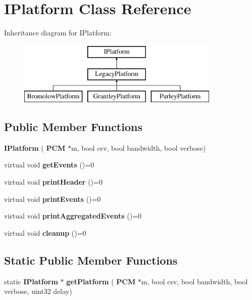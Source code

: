 \section{I\+Platform Class Reference}
\label{classIPlatform}
Inheritance diagram for I\+Platform\+:\begin{figure}[H]
\begin{center}
\leavevmode
\includegraphics[height=3.000000cm]{classIPlatform}
\end{center}
\end{figure}
\subsection*{Public Member Functions}
\begin{DoxyCompactItemize}
\item 
\mbox{\label{classIPlatform_a05ced2ea65c4f41302f2c6108ea481fa}} 
{\bfseries I\+Platform} (\textbf{ P\+CM} $\ast$m, bool csv, bool bandwidth, bool verbose)
\item 
\mbox{\label{classIPlatform_a7a7988b4d1acb07d3895ebcb3ea82f3c}} 
virtual void {\bfseries get\+Events} ()=0
\item 
\mbox{\label{classIPlatform_ab20ee48d4788a4b79b0cb4a0ea2e1861}} 
virtual void {\bfseries print\+Header} ()=0
\item 
\mbox{\label{classIPlatform_a8a01597bf0edb879174764d6d0781061}} 
virtual void {\bfseries print\+Events} ()=0
\item 
\mbox{\label{classIPlatform_a996b80ebda6bc1f1595abc546f2d3c51}} 
virtual void {\bfseries print\+Aggregated\+Events} ()=0
\item 
\mbox{\label{classIPlatform_a81474d4b6fc1d47881050f0c97564c04}} 
virtual void {\bfseries cleanup} ()=0
\end{DoxyCompactItemize}
\subsection*{Static Public Member Functions}
\begin{DoxyCompactItemize}
\item 
\mbox{\label{classIPlatform_a159a2798ac215f794b8f6aec3721d873}} 
static \textbf{ I\+Platform} $\ast$ {\bfseries get\+Platform} (\textbf{ P\+CM} $\ast$m, bool csv, bool bandwidth, bool verbose, uint32 delay)
\end{DoxyCompactItemize}
